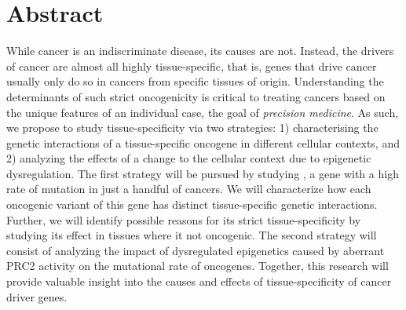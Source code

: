 \chapter{Abstract}
\normalsize

While cancer is an indiscriminate disease, its causes are not. 
Instead, the drivers of cancer are almost all highly tissue-specific, that is, genes that drive cancer usually only do so in cancers from specific tissues of origin.
Understanding the determinants of such strict oncogenicity is critical to treating cancers based on the unique features of an individual case, the goal of \emph{precision medicine}.
As such, we propose to study tissue-specificity via two strategies: 1) characterising the genetic interactions of a tissue-specific oncogene in different cellular contexts, and 2) analyzing the effects of a change to the cellular context due to epigenetic dysregulation.
The first strategy will be pursued by studying \KRAS{}, a gene with a high rate of mutation in just a handful of cancers.
We will characterize how each oncogenic variant of this gene has distinct tissue-specific genetic interactions.
Further, we will identify possible reasons for its strict tissue-specificity by studying its effect in tissues where it not oncogenic.
The second strategy will consist of analyzing the impact of dysregulated epigenetics caused by aberrant PRC2 activity on the mutational rate of oncogenes.
Together, this research will provide valuable insight into the causes and effects of tissue-specificity of cancer driver genes.
